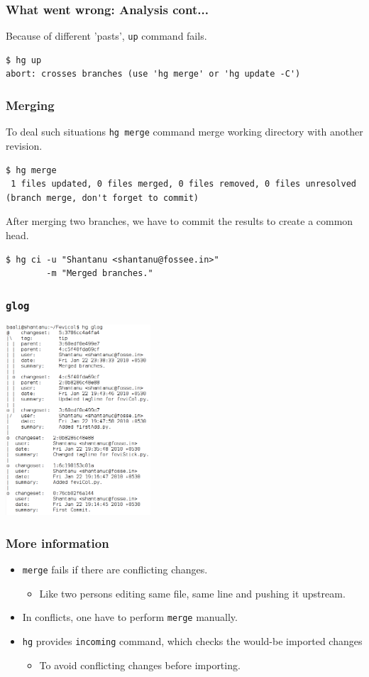\documentclass[14pt,compress]{beamer}
\newcounter{time}
\newcommand{\inctime}[1]{\addtocounter{time}{#1}{\tiny \thetime\ m}}
\newcommand{\typ}[1]{\lstinline{#1}}
\begin{document}
\begin{frame}[fragile]
  \frametitle{What went wrong: Analysis cont...}
  Because of different 'pasts', \typ{up} command fails.
  \begin{lstlisting}
$ hg up
abort: crosses branches (use 'hg merge' or 'hg update -C')
  \end{lstlisting} %
\end{frame}

\begin{frame}[fragile]
  \frametitle{Merging}
  To deal such situations \typ{hg merge} command merge working directory with another revision.
  \begin{lstlisting}
$ hg merge
 1 files updated, 0 files merged, 0 files removed, 0 files unresolved
(branch merge, don't forget to commit)   
  \end{lstlisting} %
  After merging two branches, we have to commit the results to create a common head.
  \begin{lstlisting}
$ hg ci -u "Shantanu <shantanu@fossee.in>" 
        -m "Merged branches."
  \end{lstlisting} %
  \inctime{15}
\end{frame}

\begin{frame}[fragile]
  \frametitle{\typ{glog}}
  \begin{center}
  \includegraphics[height=2.8in]{glog-2}  
  \end{center}
\end{frame}

\begin{frame}[fragile]
  \frametitle{More information}
  \begin{itemize}
  \item \typ{merge} fails if there are conflicting changes.
    \begin{itemize}
    \item Like two persons editing same file, same line and pushing it upstream.
    \end{itemize}
  \item In conflicts, one have to perform \typ{merge} manually.
  \item \typ{hg} provides \typ{incoming} command, which checks the would-be imported changes
    \begin{itemize}
    \item To avoid conflicting changes before importing.
    \end{itemize}
  \end{itemize}
\end{frame}
\end{document}
